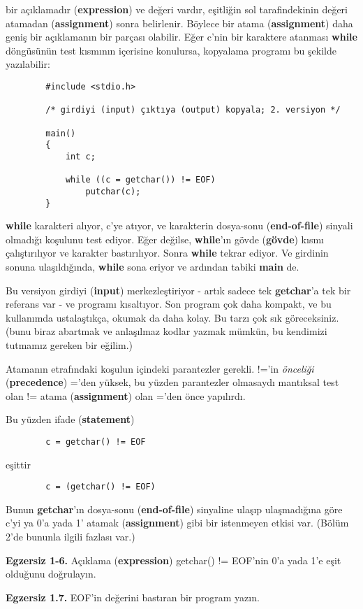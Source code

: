 \documentclass[a4paper,12pt,oneside]{book}
\begin{document}
bir açıklamadır (\textbf{expression}) ve değeri vardır, eşitliğin sol tarafindekinin değeri atamadan (\textbf{assignment}) sonra belirlenir. Böylece bir atama (\textbf{assignment}) daha geniş bir açıklamanın bir parçası olabilir. Eğer c'nin bir karaktere atanması \textbf{while} döngüsünün test kısmının içerisine konulursa, kopyalama programı bu şekilde yazılabilir:
\begin{lstlisting}
		#include <stdio.h>

		/* girdiyi (input) çıktıya (output) kopyala; 2. versiyon */

		main()
		{
			int c;

			while ((c = getchar()) != EOF)
				putchar(c);
		}
\end{lstlisting}

\textbf{while} karakteri alıyor, c'ye atıyor, ve karakterin dosya-sonu (\textbf{end-of-file}) sinyali olmadığı koşulunu test ediyor. Eğer değilse, \textbf{while}'ın gövde (\textbf{gövde}) kısmı çalıştırılıyor ve karakter bastırılıyor. Sonra \textbf{while} tekrar ediyor. Ve girdinin sonuna ulaşıldığında, \textbf{while} sona eriyor ve ardından tabiki \textbf{main} de.

\par Bu versiyon girdiyi (\textbf{input}) merkezleştiriyor - artık sadece tek \textbf{getchar}'a tek bir referans var - ve programı kısaltıyor. Son program çok daha kompakt, ve bu kullanımda ustalaştıkça, okumak da daha kolay. Bu tarzı çok sık göreceksiniz. (bunu biraz abartmak ve anlaşılmaz kodlar yazmak mümkün, bu kendimizi tutmamız gereken bir eğilim.)

\par Atamanın etrafındaki koşulun içindeki parantezler gerekli.  !='in \textit{önceliği} (\textbf{precedence})  ='den yüksek, bu yüzden parantezler olmasaydı mantıksal test olan  != atama (\textbf{assignment}) olan  ='den önce yapılırdı. \\ \pagebreak

Bu yüzden ifade (\textbf{statement})

\begin{lstlisting}
		c = getchar() != EOF
\end{lstlisting}
eşittir
\begin{lstlisting}
		c = (getchar() != EOF)
\end{lstlisting}
Bunun \textbf{getchar}'ın dosya-sonu (\textbf{end-of-file}) sinyaline ulaşıp ulaşmadığına göre c'yi ya 0'a yada 1' atamak (\textbf{assignment}) gibi bir istenmeyen etkisi var. (Bölüm 2'de bununla ilgili fazlası var.) \newline
\par \textbf{Egzersiz 1-6.} Açıklama (\textbf{expression}) getchar() != EOF'nin 0'a yada 1'e eşit olduğunu doğrulayın.
\newline
\par \textbf{Egzersiz 1.7.} EOF'in değerini bastıran bir program yazın.
\end{document}
